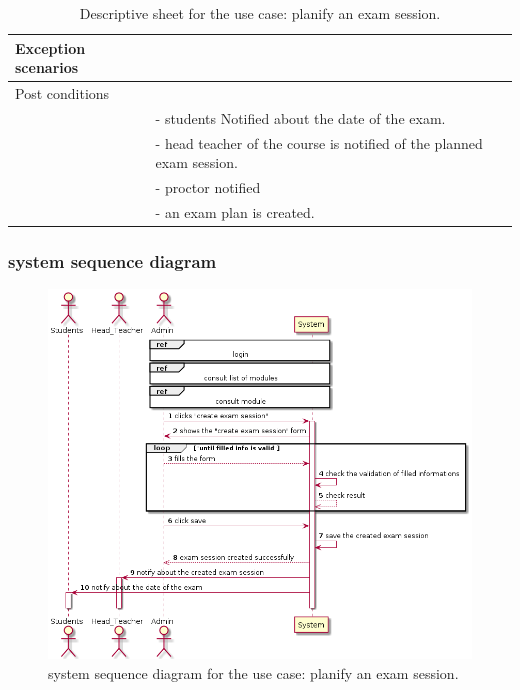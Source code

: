 \documentclass[]{uc2pfecaneva}
\begin{document}
\begin{table}[t]
\begin{tabularx}{\textwidth}{|l|X|}
            Exception scenarios   &                                                                                                                                                                   \\ \hline
            Post conditions       &                                                                                                                                                                   \\
            & - students Notified about the date of the exam.                                                                                                                   \\
            & - head teacher of the course is notified of the planned exam session.                                                                                             \\
            & - proctor notified                                                                                           \\
            & - an exam plan is created.                                                                                                                               \\ \hline
        \end{tabularx}
        \caption{Descriptive sheet for the use case: planify an exam session.}
        \label{table:2}
    \end{table}
    \clearpage

    \subsubsection{system sequence diagram}
    \begin{figure}[h]

        \centering
        \includegraphics[width=\textwidth]{images/create_exam_session}

        \caption{system sequence diagram for the use case: planify an exam session.}
    \end{figure}
    \clearpage
\end{document}
